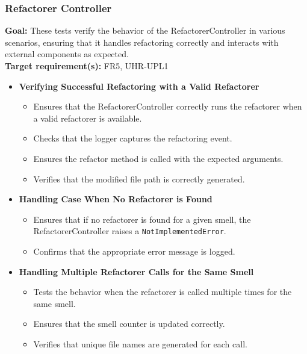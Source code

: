 \documentclass[12pt, titlepage]{article}
\begin{document}
\begin{enumerate}[label={\bf \textcolor{Maroon}{test-SRT-\arabic*}}, wide=0pt, font=\itshape]
\subsubsection{Refactorer Controller}

\textbf{Goal:} These tests verify the behavior of the RefactorerController in various scenarios, ensuring that it handles refactoring correctly and interacts with external components as expected.\\

\noindent \textbf{Target requirement(s):} FR5, UHR-UPL1~\cite{SRS} \\

\begin{itemize}
    \item \textbf{Verifying Successful Refactoring with a Valid Refactorer}
    \begin{itemize}
        \item Ensures that the RefactorerController correctly runs the refactorer when a valid refactorer is available.
        \item Checks that the logger captures the refactoring event.
        \item Ensures the refactor method is called with the expected arguments.
        \item Verifies that the modified file path is correctly generated.
    \end{itemize}

    \item \textbf{Handling Case When No Refactorer is Found}
    \begin{itemize}
        \item Ensures that if no refactorer is found for a given smell, the RefactorerController raises a \texttt{NotImplementedError}.
        \item Confirms that the appropriate error message is logged.
    \end{itemize}

    \item \textbf{Handling Multiple Refactorer Calls for the Same Smell}
    \begin{itemize}
        \item Tests the behavior when the refactorer is called multiple times for the same smell.
        \item Ensures that the smell counter is updated correctly.
        \item Verifies that unique file names are generated for each call.
    \end{itemize}


\end{itemize}
\end{enumerate}
\end{document}

